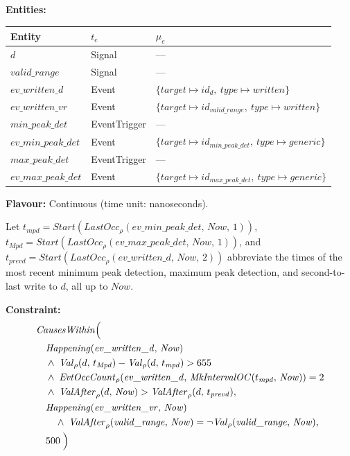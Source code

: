 \medskip
\textbf{Entities:}
\begin{center}
\begin{tabular}{lll}
    \toprule
    \textbf{Entity} & $t_e$ & $\mu_e$ \\
    \midrule
    $d$ & Signal & --- \\
    $\mathit{valid\_range}$ & Signal & --- \\
    $\mathit{ev\_written\_d}$ & Event & $\{\mathit{target} \mapsto id_d,\ \mathit{type} \mapsto \mathit{written}\}$ \\
    $\mathit{ev\_written\_vr}$ & Event & $\{\mathit{target} \mapsto id_{\mathit{valid\_range}},\ \mathit{type} \mapsto \mathit{written}\}$ \\
    $\mathit{min\_peak\_det}$ & EventTrigger & --- \\
    $\mathit{ev\_min\_peak\_det}$ & Event & $\{\mathit{target} \mapsto id_{\mathit{min\_peak\_det}},\ \mathit{type} \mapsto \mathit{generic}\}$ \\
    $\mathit{max\_peak\_det}$ & EventTrigger & --- \\
    $\mathit{ev\_max\_peak\_det}$ & Event & $\{\mathit{target} \mapsto id_{\mathit{max\_peak\_det}},\ \mathit{type} \mapsto \mathit{generic}\}$ \\
    \bottomrule
\end{tabular}
\end{center}

\textbf{Flavour:} Continuous (time unit: nanoseconds).

\medskip
Let $t_{\mathit{mpd}} = \mathit{Start}(\mathit{LastOcc}_\rho(\mathit{ev\_min\_peak\_det},\, \mathit{Now},\, 1))$,
$t_{\mathit{Mpd}} = \mathit{Start}(\mathit{LastOcc}_\rho(\mathit{ev\_max\_peak\_det},\, \mathit{Now},\, 1))$, and
$t_{\mathit{prevd}} = \mathit{Start}(\mathit{LastOcc}_\rho(\mathit{ev\_written\_d},\, \mathit{Now},\, 2))$
abbreviate the times of the most recent minimum peak detection, maximum peak detection, and second-to-last write to $d$, all up to $\mathit{Now}$.

\textbf{Constraint:}
\begin{align*}
    &\mathit{CausesWithin}\Bigl( \\
    &\quad \mathit{Happening}(\mathit{ev\_written\_d},\, \mathit{Now}) \\
    &\quad \land\; \mathit{Val}_\rho(d,\, t_{\mathit{Mpd}}) - \mathit{Val}_\rho(d,\, t_{\mathit{mpd}}) > 655 \\
    &\quad \land\; \mathit{EvtOccCount}_\rho(\mathit{ev\_written\_d},\, \mathit{MkIntervalOC}(t_{\mathit{mpd}},\, \mathit{Now})) = 2 \\
    &\quad \land\; \mathit{ValAfter}_\rho(d,\, \mathit{Now}) > \mathit{ValAfter}_\rho(d,\, t_{\mathit{prevd}}), \\
    &\quad \mathit{Happening}(\mathit{ev\_written\_vr},\, \mathit{Now}) \\
    &\qquad \land\; \mathit{ValAfter}_\rho(\mathit{valid\_range},\, \mathit{Now}) = \lnot\mathit{Val}_\rho(\mathit{valid\_range},\, \mathit{Now}), \\
    &\quad 500
    \;\Bigr)
\end{align*}

